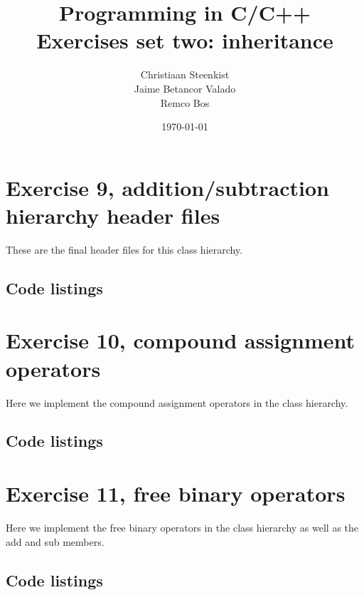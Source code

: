 \documentclass[11pt]{article}
\begin{document}
\title{Programming in C/C++ \\
       Exercises set two: inheritance
}
\date{\today}
\author{Christiaan Steenkist \\
Jaime Betancor Valado \\
Remco Bos \\
}

\maketitle
\section*{Exercise 9, addition/subtraction hierarchy header files}
These are the final header files for this class hierarchy.

\subsection*{Code listings}







\section*{Exercise 10, compound assignment operators}
Here we implement the compound assignment operators in the class hierarchy.

\subsection*{Code listings}



\section*{Exercise 11, free binary operators}
Here we implement the free binary operators in the class hierarchy as well as the add and sub members.

\subsection*{Code listings}



\end{document}
